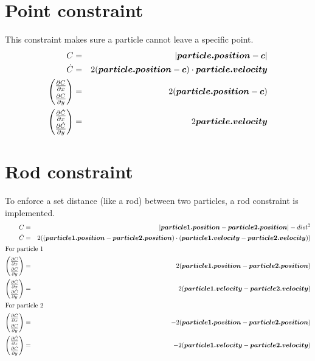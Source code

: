 \section{Point constraint}
This constraint makes sure a particle cannot leave a specific point.
\begin{eqnarray*}
C &=& |\boldsymbol{particle.position} - \boldsymbol{c}| \\
\dot{C} &=& 2(\boldsymbol{particle.position} - \boldsymbol{c}) \cdot \boldsymbol{particle.velocity} \\
\QD &=& 2(\boldsymbol{particle.position} - \boldsymbol{c})\\
\QDTD &=& 2\boldsymbol{particle.velocity}
\end{eqnarray*}

\section{Rod constraint}
To enforce a set distance (like a rod) between two particles, a rod constraint is implemented.
\begin{eqnarray*}
C &=& |\boldsymbol{particle1.position} - \boldsymbol{particle2.position}| - dist^2 \\
\dot{C} &=& 2((\boldsymbol{particle1.position} - \boldsymbol{particle2.position}) \cdot (\boldsymbol{particle1.velocity} - \boldsymbol{particle2.velocity})) \\
\shortintertext{For particle 1}
\QD &=& 2(\boldsymbol{particle1.position} - \boldsymbol{particle2.position})\\
\QDTD&=& 2(\boldsymbol{particle1.velocity} - \boldsymbol{particle2.velocity})\\
\shortintertext{For particle 2}
\QD &=& -2(\boldsymbol{particle1.position} - \boldsymbol{particle2.position})\\
\QDTD &=& -2(\boldsymbol{particle1.velocity} - \boldsymbol{particle2.velocity})
\end{eqnarray*}